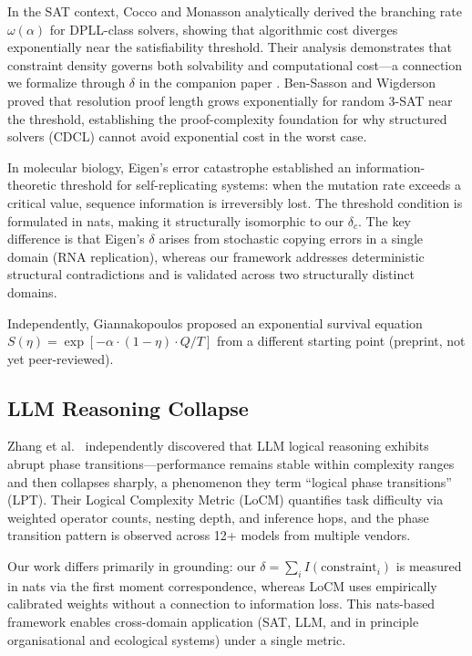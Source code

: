 \documentclass[11pt,a4paper]{article}
\begin{document}
In the SAT context, Cocco and Monasson \citep{cocco2001} analytically derived the branching rate $\omega(\alpha)$ for DPLL-class solvers, showing that algorithmic cost diverges exponentially near the satisfiability threshold. Their analysis demonstrates that constraint density governs both solvability and computational cost---a connection we formalize through $\delta$ in the companion paper \citep{sunagawa2026sat}. Ben-Sasson and Wigderson \citep{bensasson2001} proved that resolution proof length grows exponentially for random 3-SAT near the threshold, establishing the proof-complexity foundation for why structured solvers (CDCL) cannot avoid exponential cost in the worst case.

In molecular biology, Eigen's error catastrophe \citep{eigen1971} established an information-theoretic threshold for self-replicating systems: when the mutation rate exceeds a critical value, sequence information is irreversibly lost. The threshold condition is formulated in nats, making it structurally isomorphic to our $\delta_c$. The key difference is that Eigen's $\delta$ arises from stochastic copying errors in a single domain (RNA replication), whereas our framework addresses deterministic structural contradictions and is validated across two structurally distinct domains.

Independently, Giannakopoulos \citep{giannakopoulos2025} proposed an exponential survival equation $S(\eta) = \exp[-\alpha \cdot (1-\eta) \cdot Q/T]$ from a different starting point (preprint, not yet peer-reviewed).

\subsection{LLM Reasoning Collapse}

Zhang et al.\ \citep{zhang2026lpt} independently discovered that LLM logical reasoning exhibits abrupt phase transitions---performance remains stable within complexity ranges and then collapses sharply, a phenomenon they term ``logical phase transitions'' (LPT). Their Logical Complexity Metric (LoCM) quantifies task difficulty via weighted operator counts, nesting depth, and inference hops, and the phase transition pattern is observed across 12+ models from multiple vendors.

Our work differs primarily in grounding: our $\delta = \sum_i I(\text{constraint}_i)$ is measured in nats via the first moment correspondence, whereas LoCM uses empirically calibrated weights without a connection to information loss. This nats-based framework enables cross-domain application (SAT, LLM, and in principle organisational and ecological systems) under a single metric.
\end{document}
